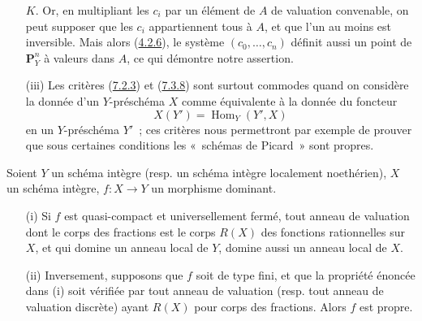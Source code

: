 \begin{remark}[7.3.9]
\begin{enumerate}
$K$. Or, en multipliant les $c_i$ par un élément de $A$ de
valuation convenable, on peut supposer que les $c_i$ appartiennent tous à
$A$, et que l'un au moins est inversible. Mais alors
(\hyperref[II.4.2.6-fr]{4.2.6}), le système $(c_0,\ldots,c_n)$ définit aussi
un point de $\mathbf{P}_Y^n$ à valeurs dans $A$, ce qui démontre notre
assertion.
\item[\rm (iii)] Les critères (\hyperref[II.7.2.3-fr]{7.2.3}) et
(\hyperref[II.7.3.8-fr]{7.3.8}) sont surtout commodes quand on considère la
donnée d'un $Y$-préschéma $X$ comme équivalente à la donnée du foncteur
\[
X(Y')=\operatorname{Hom}_Y(Y',X)
\]
en un $Y$-préschéma $Y'$~; ces critères nous permettront par exemple de
prouver que sous certaines conditions les «~schémas de Picard~» sont propres.
\end{enumerate}
\end{remark}

\begin{corollary}[7.3.10]
\label{II.7.3.10-fr}
Soient $Y$ un schéma intègre (resp. un schéma intègre localement noethérien),
$X$ un schéma intègre, $f:X\to Y$ un morphisme dominant.
\begin{enumerate}
\item[\rm (i)] Si $f$ est quasi-compact et universellement fermé, tout anneau
de valuation dont le corps des fractions est le corps $R(X)$ des fonctions
rationnelles sur $X$, et qui domine un anneau local de $Y$, domine aussi un
anneau local de $X$.
\item[\rm (ii)] Inversement, supposons que $f$ soit de type fini, et que la
propriété énoncée dans (i) soit vérifiée par tout anneau de valuation (resp.
tout anneau de valuation discrète) ayant $R(X)$ pour corps des fractions.
Alors $f$ est propre.
\end{enumerate}
\end{corollary}


